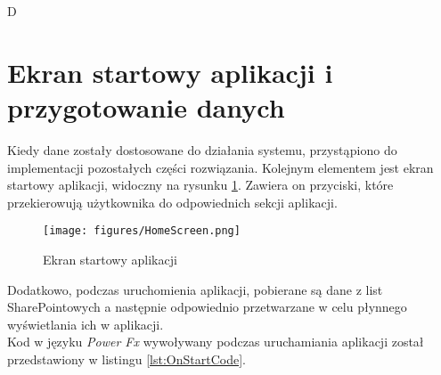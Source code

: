 D\section{Ekran startowy aplikacji i przygotowanie danych}
Kiedy dane zostały dostosowane do działania systemu, przystąpiono do implementacji pozostałych części rozwiązania.
Kolejnym elementem jest ekran startowy aplikacji, widoczny na rysunku \ref{fig:homescreen}. Zawiera on przyciski, które przekierowują użytkownika do odpowiednich sekcji aplikacji.

\begin{figure}[h]
    \centering
    \texttt{[image: figures/HomeScreen.png]}
    \caption{Ekran startowy aplikacji} 
    \label{fig:homescreen}
\end{figure}

Dodatkowo, podczas uruchomienia aplikacji, pobierane są dane z list SharePointowych a następnie odpowiednio przetwarzane w celu płynnego wyświetlania ich w aplikacji. \\
Kod w języku \emph{Power Fx} wywoływany podczas uruchamiania aplikacji został przedstawiony w listingu \ref{lst:OnStartCode}.

